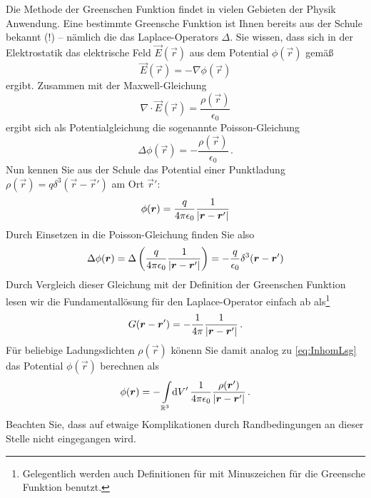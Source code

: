 \documentclass[paper=a4, fontsize=11.0pt, abstractoff, DIV12]{scrartcl}
\begin{document}
Die Methode der Greenschen Funktion findet in vielen Gebieten der Physik
Anwendung. Eine bestimmte Greensche Funktion ist Ihnen bereits aus der
Schule bekannt (!) -- nämlich die das Laplace-Operators $\Delta$. Sie
wissen, dass sich in der Elektrostatik das elektrische Feld $\vec E(\vec r)$
aus dem Potential $\phi(\vec r)$ gemäß
\begin{equation}
\vec E(\vec r) = - \nabla \phi(\vec r)
\end{equation}
ergibt. Zusammen mit der Maxwell-Gleichung
\begin{equation}
\nabla\cdot\vec E(\vec r) = \frac{\rho(\vec r)}{\epsilon_0}
\end{equation}
ergibt sich als Potentialgleichung die sogenannte Poisson-Gleichung
\begin{equation}
\Delta\phi(\vec r) = -\frac{\rho(\vec r)}{\epsilon_0}\,.
\end{equation}
Nun kennen Sie aus der Schule das Potential einer Punktladung $\rho(\vec r)
= q \delta^3(\vec r - \vec r')$ am Ort $\vec r'$:
\begin{equation}
\phi({\boldsymbol{r}}) = \frac{q}{4\pi\epsilon_0}\frac{1}{\left\vert {\ensuremath{\boldsymbol{r}}} - {\boldsymbol{r}}' \right\vert}
\end{equation}
Durch Einsetzen in die Poisson-Gleichung finden Sie also
\begin{equation}
\Delta\phi({\boldsymbol{r}}) = \Delta\left(\frac{q}{4\pi\epsilon_0}\frac{1}{\left\vert {\ensuremath{\boldsymbol{r}}} - {\boldsymbol{r}}' \right\vert}\right) = -\frac{q}{\epsilon_0} \delta^3({\boldsymbol{r}} - {\boldsymbol{r}}')
\end{equation}
Durch Vergleich dieser Gleichung mit der Definition der Greenschen Funktion
lesen wir die Fundamentallösung für den Laplace-Operator einfach ab
als\footnote{Gelegentlich werden auch Definitionen für mit Minuszeichen für
die Greensche Funktion benutzt.}
\begin{equation}
G({\boldsymbol{r}} - {\boldsymbol{r}}') = -\frac{1}{4\pi}\frac{1}{\left\vert {\ensuremath{\boldsymbol{r}}} - {\boldsymbol{r}}' \right\vert}\,.
\end{equation}
Für beliebige Ladungsdichten $\rho(\vec r)$ könenn Sie damit analog zu
\eqref{eq:InhomLsg} das Potential $\phi(\vec r)$ berechnen als
\begin{equation}
\phi({\boldsymbol{r}}) = -\int\limits_{\mathbb{R}^3}\!\mathrm{d} V'\,\frac{1}{4\pi\epsilon_0}\frac{\rho({\boldsymbol{r}}')}{\left\vert {\ensuremath{\boldsymbol{r}}} - {\boldsymbol{r}}' \right\vert}\,.
\end{equation}
Beachten Sie, dass auf etwaige Komplikationen durch Randbedingungen an dieser
Stelle nicht eingegangen wird.





\end{document}

